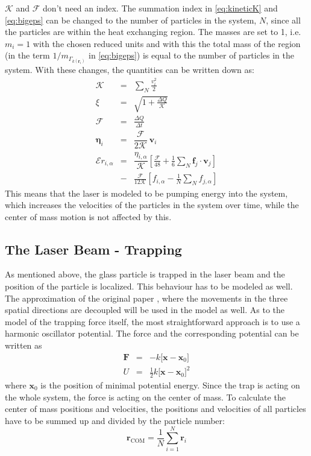 \documentclass[12pt]{article}
\begin{document}
$\mathcal{K}$ and $\mathcal{F}$ don't need an index. The summation index in \eqref{eq:kineticK} and \eqref{eq:bigeps} can be changed to the number of
particles in the system, $N$, since all the particles are within the heat exchanging region. The masses are set to 1, i.e. $m_i = 1$ with the chosen
reduced units and with this the total mass of the region (in the term $1/m_{\Gamma_{k(\mathbf{r}_i)}}$ in \eqref{eq:bigeps}) is equal to the number of
particles in the system. With these changes, the quantities can be written down as:
\begin{eqnarray}
    \mathcal{K} &=& \sum_{N} \frac{v_i^2}{2}\\
    \xi &=& \sqrt{1+\frac{\Delta Q}{\mathcal{K}}}\\
    \mathcal{F} &=& \frac{\Delta Q}{\Delta t}\\
    \boldsymbol{\eta}_i &=& 
    \dfrac{\mathcal{F}}{{2\mathcal{K}}} \
        \mathbf{v}_i\\
        \mathcal{E}{r}_{i,\alpha} &=& \dfrac{\eta_{i,\alpha}}{\mathcal{K}} \left[
        \frac{\mathcal{F}}{48} + \frac{1}{6} \sum_{N} \mathbf{f}_j \cdot \mathbf{v}_j
            \right] \nonumber \\
            &-& \frac{\mathcal{F}}{12\mathcal{K}} \left[
            {f_{i,\alpha}} - \frac{1}{N} \sum_{N}f_{j,\alpha}\right]
\end{eqnarray}
This means that the laser is modeled to be pumping energy into the system, which increases the velocities of the particles in the
system over time, while the center of mass motion is not affected by this.\\


\subsection{The Laser Beam - Trapping}
As mentioned above, the glass particle is trapped in the laser beam and the position of the particle is localized. This behaviour
has to be modeled as well.\\
The approximation of the original paper \cite{Gieseler2014}, where the movements in the three spatial directions are decoupled will be
used in the model as well. As to the model of the trapping force itself, the most straightforward approach is to use a harmonic oscillator potential.
The force and the corresponding potential can be written as
\begin{eqnarray}
    \mathbf{F} &=& -k \Big[\mathbf{x}-\mathbf{x}_0\Big]\\
    U &=& \frac12 k \Big[\mathbf{x}-\mathbf{x}_0\Big]^2
\end{eqnarray}
where $\mathbf{x}_0$ is the position of minimal potential energy. 
Since the trap is acting on the whole system, the force is acting on the center of mass. 
To calculate the center of mass positions and velocities, the positions and velocities of all particles have to be summed up and 
divided by the particle number:
\begin{equation}
    \mathbf{r}_\text{COM} = \frac1N\sum_{i=1}^N \mathbf{r}_i
\end{equation}
\end{document}
